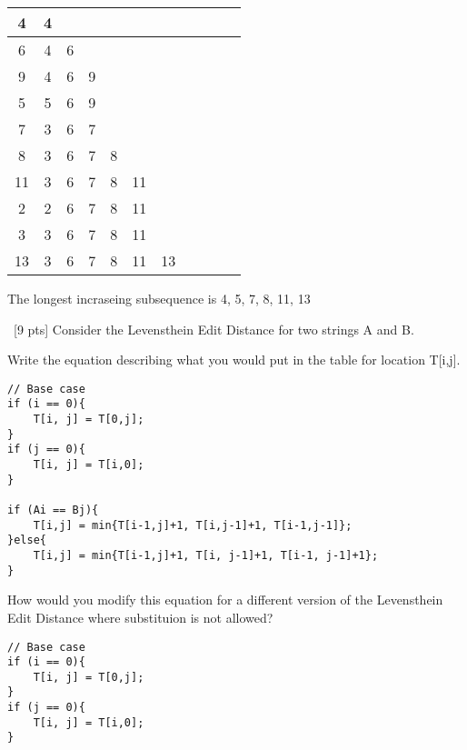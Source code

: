 \documentclass[12pt]{article}
\newenvironment{sol}[1][Solution]{\begin{trivlist}\item[\hskip\labelsep {\bfseries #1:}]}{\end{trivlist}}
\begin{document}
\begin{enumerate}
\begin{sol}
    \hspace*{\fill}
    \begin{center}
        \begin{tabular}{|c|c|c|c|c|c|c|c|c|c|c|}
        \hline
             4& 4& & & & & & & & & \\
                     \hline
             6& 4& 6 & & & & & & & & \\
                   \hline
             9& 4& 6 &9 & & & & & & & \\
                     \hline
             5& 5& 6& 9& & & & & & & \\
                     \hline
             7& 3& 6& 7& & & & & & & \\
                     \hline
             8& 3& 6& 7 &8 & & & & & & \\
                     \hline
             11& 3&6 &7 & 8& 11& & & & & \\
                     \hline
             2& 2& 6 & 7 &8 &11 & &  & & & \\
                     \hline
             3& 3& 6 & 7& 8&11 & & & & & \\
                     \hline
             13&  3& 6&7 & 8& 11&13 & & & & \\
                     \hline
        \end{tabular}
    \end{center}
    The longest incraseing subsequence is 4, 5, 7, 8, 11, 13 
    \end{sol}

        \item \ [9 pts] Consider the Levensthein Edit Distance for two strings A and B.
        \begin{enumerate}
            \item Write the equation describing what you would put in the table for location T[i,j].
                    \begin{sol}
        \hspace*{\fill}
             \begin{verbatim}
// Base case
if (i == 0){
    T[i, j] = T[0,j];
}
if (j == 0){
    T[i, j] = T[i,0];
}

if (Ai == Bj){
    T[i,j] = min{T[i-1,j]+1, T[i,j-1]+1, T[i-1,j-1]};
}else{
    T[i,j] = min{T[i-1,j]+1, T[i, j-1]+1, T[i-1, j-1]+1};
}
\end{verbatim}
        \end{sol}
            \item How would you modify this equation for a different version of the Levensthein Edit Distance where substituion is not allowed?
                    \begin{sol}
        \hspace*{\fill}
             \begin{verbatim}
// Base case
if (i == 0){
    T[i, j] = T[0,j];
}
if (j == 0){
    T[i, j] = T[i,0];
}


\end{verbatim}
\end{sol}
\end{enumerate}
\end{enumerate}
\end{document}
